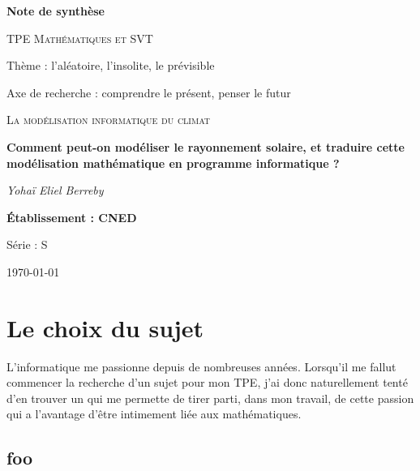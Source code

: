 \documentclass[12pt,a4paper]{article}
\begin{document}
\begin{titlepage}
	\centering
	
	{ \Huge \bfseries Note de synthèse\par}
	\vspace{1cm}

	{\scshape\Large TPE Mathématiques et SVT\par}
	\vspace{0.2cm}	
	Thème : l'aléatoire, l'insolite, le prévisible\par
	Axe de recherche : comprendre le présent, penser le futur\par
	\vspace{1.5cm}

	{\scshape\LARGE La modélisation informatique du climat \par}
	\vspace{1cm}
	{\huge\bfseries Comment peut-on modéliser le rayonnement solaire, et traduire cette modélisation mathématique en programme informatique ?\par}

	\vspace{1cm}
	{\Large\itshape Yohaï Eliel Berreby\par}
	
	\vfill
	
	
	{\Large\bfseries Établissement : CNED\par
	Série : S }

	\vfill

	{\large \today\par}
\end{titlepage}


\section{Le choix du sujet}

L'informatique me passionne depuis de nombreuses années.
Lorsqu'il me fallut commencer la recherche d'un sujet pour mon TPE, j'ai donc naturellement tenté d'en trouver un qui me permette de tirer parti, dans mon travail, de cette passion qui a l'avantage d'être intimement liée aux mathématiques.
 

\subsection{foo}
\end{document}
